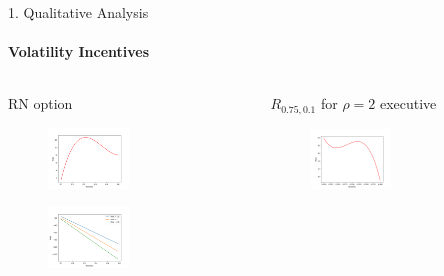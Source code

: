 \documentclass{beamer}
\begin{document}
\begin{frame}{1. Qualitative Analysis}
    \framesubtitle{Volatility Incentives}

    \begin{columns}[c]
        \begin{column}{0.5\textwidth} 
            \centering
            RN option
            \begin{figure}[!h]
                \centering
                \includegraphics[width=0.5\textwidth]{../fig/4/vega_obj.png}
            \end{figure}
            \begin{figure}[!h]
                \centering
                \includegraphics[width=0.5\textwidth]{../fig/4/vega_subj.png}
            \end{figure}
        \end{column}
        \begin{column}{0.5\textwidth}
            \centering
            $R_{0.75, 0.1}$ for $\rho = 2$ executive
            \begin{figure}[!h]
                \centering
                \includegraphics[width=0.5\textwidth]{../fig/4/r_vega_obj.png}

\end{figure}
\end{column}
\end{columns}
\end{frame}
\end{document}
